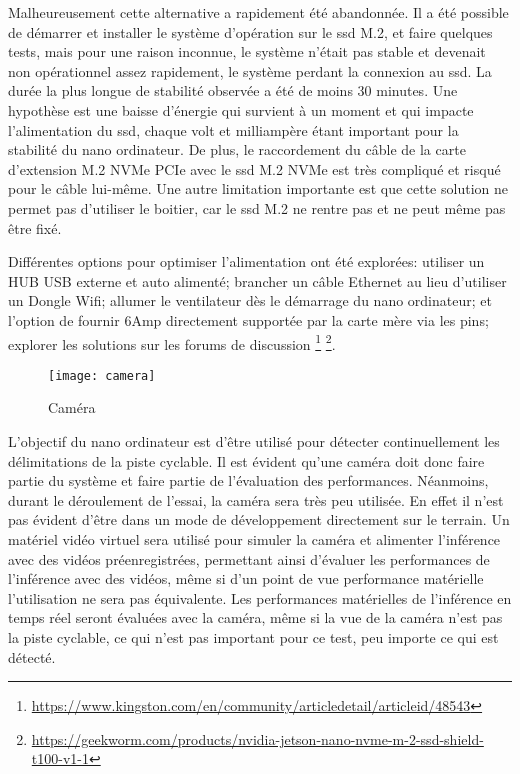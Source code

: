 \par Malheureusement cette alternative a rapidement été abandonnée. Il a été possible de démarrer et installer le système d'opération sur le \acrshort{ssd} M.2, et faire quelques tests, mais pour une raison inconnue, le système n'était pas stable et devenait non opérationnel assez rapidement, le système perdant la connexion au \acrshort{ssd}. La durée la plus longue de stabilité observée a été de moins 30 minutes. Une hypothèse est une baisse d'énergie qui survient à un moment et qui impacte l'alimentation du \acrshort{ssd}, chaque volt et milliampère étant important pour la stabilité du nano ordinateur. De plus, le raccordement du câble de la carte d'extension M.2 NVMe PCIe avec le \acrshort{ssd} M.2 NVMe est très compliqué et risqué pour le câble lui-même. Une autre limitation importante est que cette solution ne permet pas d'utiliser le boitier, car le \acrshort{ssd} M.2 ne rentre pas et ne peut même pas être fixé. 
\par Différentes options pour optimiser l'alimentation ont été explorées: utiliser un HUB USB externe et auto alimenté; brancher un câble Ethernet au lieu d'utiliser un Dongle Wifi; allumer le ventilateur dès le démarrage du nano ordinateur; et l'option de fournir 6Amp directement supportée par la carte mère via les pins; explorer les solutions sur les forums de discussion \footnote{\url{https://www.kingston.com/en/community/articledetail/articleid/48543}} \footnote{\url{https://geekworm.com/products/nvidia-jetson-nano-nvme-m-2-ssd-shield-t100-v1-1}}.
\begin{figure}[H]
    \centering
    \texttt{[image: camera]}
    \caption{Caméra}
    \label{fig:camera}
\end{figure}
\par L'objectif du nano ordinateur est d'être utilisé pour détecter continuellement les délimitations de la piste cyclable. Il est évident qu'une caméra doit donc faire partie du système et faire partie de l'évaluation des performances. Néanmoins, durant le déroulement de l'essai, la caméra sera très peu utilisée. En effet il n'est pas évident d'être dans un mode de développement directement sur le terrain. Un matériel vidéo virtuel sera utilisé pour simuler la caméra et alimenter l'inférence avec des vidéos préenregistrées, permettant ainsi d'évaluer les performances de l'inférence avec des vidéos, même si d'un point de vue performance matérielle l'utilisation ne sera pas équivalente. Les performances matérielles de l'inférence en temps réel seront évaluées avec la caméra, même si la vue de la caméra n'est pas la piste cyclable, ce qui n'est pas important pour ce test, peu importe ce qui est détecté. 
